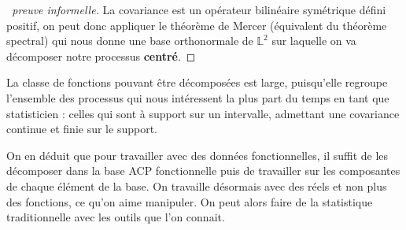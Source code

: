 \begin{thm*}
    \noindent{}
    \label{thm*:KL}
\end{thm*}
\begin{proof}[\faCogs \, preuve informelle]
    La covariance est un opérateur bilinéaire symétrique défini positif, on peut donc appliquer le théorème de Mercer (équivalent du théorème spectral) qui nous donne une base orthonormale de $\mathds L^2$ sur laquelle on va décomposer notre processus \textbf{centré}.
\end{proof}
\begin{rem}
    La classe de fonctions pouvant être décomposées est large, puisqu'elle regroupe l'ensemble des processus qui nous intéressent la plus part du temps en tant que statisticien : celles qui sont à support sur un intervalle, admettant une covariance continue et finie sur le support.
\end{rem}

On en déduit que pour travailler avec des données fonctionnelles, il suffit de les décomposer dans la base ACP fonctionnelle puis de travailler sur les composantes de chaque élément de la base. On travaille désormais avec des réels et non plus des fonctions, ce qu'on aime manipuler. On peut alors faire de la statistique traditionnelle avec les outils que l'on connait.


\begin{propriete*}
    \noindent{}
\end{propriete*}
